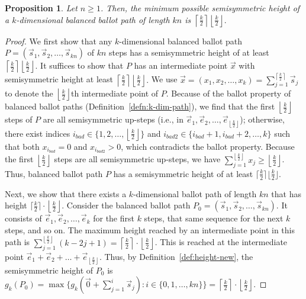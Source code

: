 \documentclass[11pt]{article}
\newtheorem{proposition}[theorem]{Proposition}
\newtheorem{remark}[theorem]{Remark}
\theoremstyle{remark}
\theoremstyle{definition}
\begin{document}
\begin{proposition}\label{prop:MinHeight}
Let $n \geq 1$. Then, the minimum possible semisymmetric height of a $k$-dimensional balanced ballot path of length $kn$ is $\left\lceil \frac{k}{2}\right\rceil \left\lfloor \frac{k}{2} \right\rfloor.$
\end{proposition}
\begin{proof}
We first show that any $k$-dimensional balanced ballot path $P = (\vec{s}_1, \vec{s}_2, \dots, \vec{s}_{kn})$ of $kn$ steps has a semisymmetric height of at least $\left\lceil \frac{k}{2}\right\rceil \left\lfloor \frac{k}{2} \right\rfloor.$  It suffices to show that $P$ has an intermediate point $\vec{x}$ with semisymmetric height at least $\left\lceil \frac{k}{2}\right\rceil \left \lfloor \frac{k}{2} \right\rfloor.$ We use $\vec{x} = (x_1, x_2, \dots, x_k) = \sum_{j=1}^{\left\lceil \frac{k}{2}\right\rceil}\vec{s}_{j}$ to denote the $\left\lfloor \frac{k}{2}\right\rfloor$th intermediate point of $P$. Because of the ballot property of balanced ballot paths (Definition~\ref{defn:k-dim-path}), we find that the first $\left\lfloor \frac{k}{2} \right\rfloor$ steps of $P$ are all semisymmetric up-steps (i.e., in ${\vec{e}_{1}, \vec{e}_2, \dots, \vec{e}_{\left\lfloor \frac{k}{2} \right\rfloor}}$); otherwise, there exist indices $i_{bad} \in \{1, 2, \dots, \left\lfloor \frac{k}{2} \right\rfloor \}$ and $i_{bad2} \in \{i_{bad}+1, i_{bad}+2, \dots, k\}$ such that both $x_{i_{bad}} = 0$ and $x_{i_{bad2}} > 0$, which contradicts the ballot property.  Because the first $\left\lfloor \frac{k}{2}\right\rfloor$ steps are all semisymmetric up-steps, we have $\sum_{j=1}^{\left\lfloor \frac{k}{2}\right\rfloor}x_j \geq \left\lfloor \frac{k}{2}\right\rfloor$. Thus, balanced ballot path $P$ has a semisymmetric height of at least $\lceil \frac{k}{2} \rceil \lfloor \frac{k}{2} \rfloor$.

Next, we show that there exists a $k$-dimensional ballot path of length $kn$ that has height $\lceil \frac{k}{2}\rceil \cdot \left\lfloor \frac{k}{2} \right\rfloor$. Consider the balanced ballot path $P_0 = (\vec{s}_1, \vec{s}_2, \dots, \vec{s}_{kn})$. It consists of $\vec{e}_1, \vec{e}_2, \dots, \vec{e}_k$ for the first $k$ steps, that same sequence for the next $k$ steps, and so on. The maximum height reached by an intermediate point in this path is $\sum_{j=1}^{\left\lfloor\frac{k}{2} \right\rfloor}(k-2j+1) =  \left\lceil \frac{k}{2} \right\rceil \cdot \left\lfloor\frac{k}{2} \right\rfloor$. This is reached at the intermediate point $\vec{e}_1+\vec{e}_2+\dots+\vec{e}_{\left\lfloor \frac{k}{2} \right\rfloor }$. Thus, by Definition~\ref{def:height-new}, the semisymmetric height of $P_0$ is $g_k(P_0) = \max \{g_k(\vec{0}+\sum_{j=1}^i\vec{s}_j):i \in \{0, 1, \dots, kn\}\} = \left\lceil \frac{k}{2} \right\rceil \cdot \left\lfloor\frac{k}{2} \right\rfloor$.


\end{proof}
\end{document}
